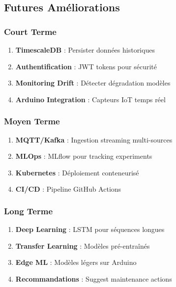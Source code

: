 \documentclass[12pt,a4paper,french]{article}
\begin{document}
\subsection{Futures Améliorations}

\subsubsection{Court Terme}

\begin{enumerate}
    \item \textbf{TimescaleDB} : Persister données historiques
    \item \textbf{Authentification} : JWT tokens pour sécurité
    \item \textbf{Monitoring Drift} : Détecter dégradation modèles
    \item \textbf{Arduino Integration} : Capteurs IoT temps réel
\end{enumerate}

\subsubsection{Moyen Terme}

\begin{enumerate}
    \item \textbf{MQTT/Kafka} : Ingestion streaming multi-sources
    \item \textbf{MLOps} : MLflow pour tracking experiments
    \item \textbf{Kubernetes} : Déploiement conteneurisé
    \item \textbf{CI/CD} : Pipeline GitHub Actions
\end{enumerate}

\subsubsection{Long Terme}

\begin{enumerate}
    \item \textbf{Deep Learning} : LSTM pour séquences longues
    \item \textbf{Transfer Learning} : Modèles pré-entraînés
    \item \textbf{Edge ML} : Modèles légers sur Arduino
    \item \textbf{Recommandations} : Suggest maintenance actions
\end{enumerate}
\end{document}
